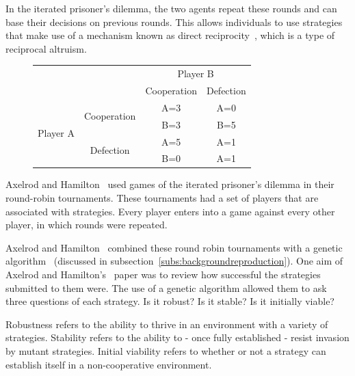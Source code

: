\documentclass[]{final_report}
\begin{document}
In the iterated prisoner's dilemma, the two agents repeat these rounds and can base their decisions on previous rounds. This allows individuals to use strategies that make use of a mechanism known as direct reciprocity~\cite{five_rules_coop}, which is a type of reciprocal altruism.\par 
\begin{figure}
\vspace{-20pt}
\begin{framed}
	\begin{center}
		\begin{tabular}{cc|c|c}
		& & \multicolumn{2}{c}{Player B}\\
		& & Cooperation & Defection\\
		\cline{1-4}
		\multirow{4}{*}{Player A} &\multirow{2}{*}{Cooperation} & A=3 & A=0\\
		& & B=3 & B=5\\
		\cline{2-4}
		& \multirow{2}{*}{Defection} & A=5 & A=1\\
		& & B=0 & A=1\\
		\end{tabular}
		\label{tab:payoffmatrix}
	\end{center}	
\end{framed}
\vspace{-20pt}
\end{figure}
Axelrod and Hamilton~\cite{evolution_of_cooperation} used games of the iterated prisoner's dilemma in their round-robin tournaments. These tournaments had a set of players that are associated with strategies. Every player enters into a game against every other player, in which rounds were repeated.\par 
Axelrod and Hamilton~\cite{evolution_of_cooperation} combined these round robin tournaments with a genetic algorithm~\cite{mitchell1998introduction} (discussed in subsection~\ref{subs:backgroundreproduction}). One aim of Axelrod and Hamilton's~\cite{evolution_of_cooperation} paper was to review how successful the strategies submitted to them were. The use of a genetic algorithm allowed them to ask three questions of each strategy. Is it robust? Is it stable? Is it initially viable?\par
Robustness refers to the ability to thrive in an environment with a variety of strategies. Stability refers to the ability to - once fully established - resist invasion by mutant strategies. Initial viability refers to whether or not a strategy can establish itself in a non-cooperative environment.\par
\end{document}
